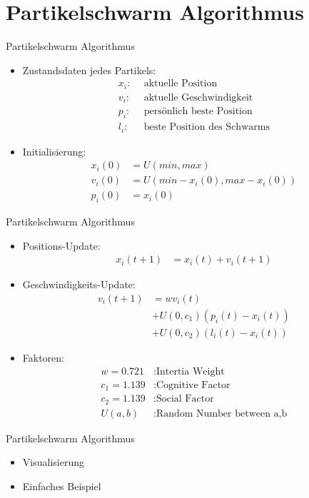 \section[Algorithmus]{Partikelschwarm Algorithmus}
\begin{frame}{Partikelschwarm Algorithmus}
\begin{itemize}

	\item Zustandsdaten jedes Partikels:
	\begin{align*}
		x_i: \: \: & \text{aktuelle Position}\\
		v_i: \: \: & \text{aktuelle Geschwindigkeit}\\
		p_i: \: \: & \text{persönlich beste Position} \\
		l_i: \: \: & \text{beste Position des Schwarms}
	\end{align*}
	

	\item Initialisierung:
	\begin{align*}
		x_i(0) &= U(min,max) \\
		v_i(0) &= U(min - x_i(0), max - x_i(0)) \\
		p_i(0) &= x_i(0)
	\end{align*}

\end{itemize}	
\end{frame}

\begin{frame}{Partikelschwarm Algorithmus}
\begin{itemize}
	\item Positions-Update: 
	\begin{align*}
		x_{i}(t+1) &= x_i(t) + v_i(t+1)
	\end{align*}
	
	\item Geschwindigkeits-Update:
	\begin{align*}
		v_i(t+1) &= w v_i(t) \\
				&+ U(0,c_1) \left(p_i(t)-x_i(t) \right) \\
				&+ U(0,c_2) \left(l_i(t)-x_i(t) \right)
	\end{align*}
	
	\item Faktoren: 
	\begin{align*}
		w = 0.721 &: \text{Intertia Weight} \\
		c_1 = 1.139 &: \text{Cognitive Factor} \\
		c_2 = 1.139 &: \text{Social Factor} \\
		U(a,b) &: \text{Random Number between a,b}
	\end{align*}
\end{itemize}	
\end{frame}

\begin{frame}{Partikelschwarm Algorithmus}
	\begin{itemize}
		\item Visualisierung
			\only<1>{\begin{figure}[htbp]
				
			\end{figure}}
		\item Einfaches Beispiel
	\end{itemize}
\end{frame}